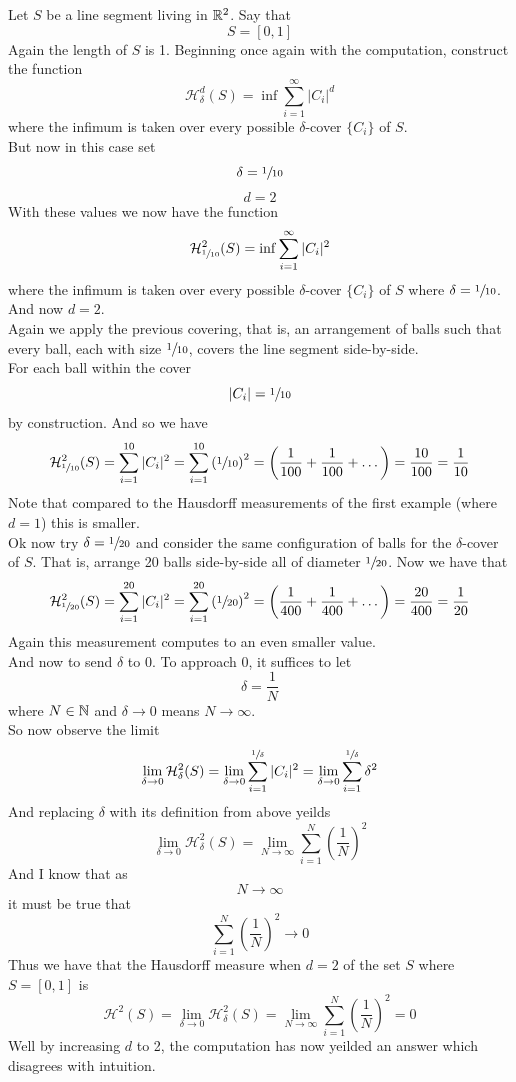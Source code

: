 \documentclass[11pt]{ekblite}
\begin{document}
\begin{example}[Line segment with $d = 2$]
	Let $S$ be a line segment living in $\mathbb{R}^2$. Say that
	\[S = [0,1]\]
	Again the length of $S$ is 1. Beginning once again with the computation, construct the function
	\[\mathcal{H}_{\delta}^d (S) = \inf \sum_{i=1}^{\infty} |C_i|^d\]
	where the infimum is taken over every possible $\delta$-cover $\{C_i\}$ of $S$.
	\\[0.2in]But now in this case set
	\[\delta = \sfrac{1}{10}\]
	\[d = 2\]
	With these values we now have the function
	\[\mathcal{H}_{\sfrac{1}{10}}^{2} (S) = \inf \sum_{i=1}^{\infty} |C_i|^2\]
	where the infimum is taken over every possible $\delta$-cover $\{C_i\}$ of $S$ where $\delta = \sfrac{1}{10}$.
	\\[0.2in]And now $d=2$.
	\\[0.2in]Again we apply the previous covering, that is, an arrangement of balls such that every ball, each with size $\sfrac{1}{10}$, covers the line segment side-by-side.
	\\[0.2in]For each ball within the cover
	\[|C_i| = \sfrac{1}{10}\]
	by construction. And so we have 
	\[\mathcal{H}_{\sfrac{1}{10}}^{2} (S) = \sum_{i=1}^{10} |C_i|^2 = \sum_{i=1}^{10} \left( \sfrac{1}{10} \right)^2 = \left( \frac{1}{100} + \frac{1}{100} + \dots \right) = \frac{10}{100} = \frac{1}{10}\]
	Note that compared to the Hausdorff measurements of the first example (where $d = 1$) this is smaller.
	\\[0.2in]Ok now try $\delta = \sfrac{1}{20}$ and consider the same configuration of balls for the $\delta$-cover of $S$. That is, arrange 20 balls side-by-side all of diameter $\sfrac{1}{20}$. Now we have that
	\[\mathcal{H}_{\sfrac{1}{20}}^{2} (S) = \sum_{i=1}^{20} |C_i|^2 = \sum_{i=1}^{20} \left( \sfrac{1}{20} \right)^2 = \left( \frac{1}{400} + \frac{1}{400} + \dots \right) = \frac{20}{400} = \frac{1}{20}\]
	Again this measurement computes to an even smaller value.
	\\[0.2in]And now to send $\delta$ to 0. To approach 0, it suffices to let
	\[\delta = \frac{1}{N}\]
	where $N \in \mathbb{N}$ and $\delta \rightarrow 0$ means $N \rightarrow \infty$.
	\\[0.2in]So now observe the limit
	\[\lim_{\delta \rightarrow 0} \mathcal{H}_{\delta}^{2} (S) = \lim_{\delta \rightarrow 0} \sum_{i=1}^{\sfrac{1}{\delta}} |C_i|^2 = \lim_{\delta \rightarrow 0} \sum_{i=1}^{\sfrac{1}{\delta}} \delta^2\]
	And replacing $\delta$ with its definition from above yeilds 
	\[\lim_{\delta \rightarrow 0} \mathcal{H}_{\delta}^{2} (S) = \lim_{N \rightarrow \infty} \sum_{i=1}^{N} \left( \frac{1}{N} \right)^2\]
	And I know that as
	\[N \rightarrow \infty\]
	it must be true that
	\[\sum_{i=1}^{N} \left( \frac{1}{N} \right)^2 \rightarrow 0\]
	Thus we have that the Hausdorff measure when $d = 2$ of the set $S$ where $S = [0,1]$ is
	\[\mathcal{H}^2 (S) = \lim_{\delta \rightarrow 0} \mathcal{H}_{\delta}^{2} (S) = \lim_{N \rightarrow \infty} \sum_{i=1}^{N} \left( \frac{1}{N}\right)^2 = 0\]
	Well by increasing $d$ to 2, the computation has now yeilded an answer which disagrees with intuition.
\end{example}
\end{document}
